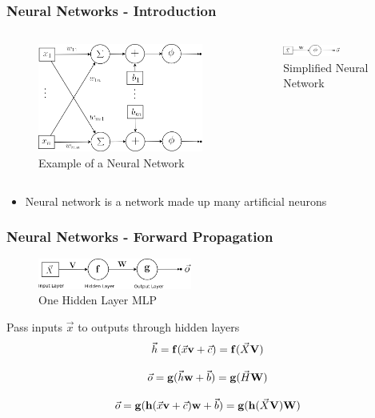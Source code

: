 \documentclass{beamer}
\begin{document}
\begin{frame}
\frametitle{Neural Networks - Introduction}
\begin{columns}
\begin{figure}[t!]
    \centering
    \includegraphics[width=\textwidth]{../paper/pictures/figures/detail_NN.png}
    \caption{Example of a Neural Network}
    \label{fig:detail_NN}
\end{figure}

\begin{figure}[t!]
    \centering
    \includegraphics[width=0.6\textwidth]{../paper/pictures/figures/NN.png}
    \caption{Simplified Neural Network}
    \label{fig:NN}
\end{figure}
\end{columns}

\begin{itemize}
\item Neural network is a network made up many artificial neurons
\end{itemize}
\end{frame}

\begin{frame}
\frametitle{Neural Networks - Forward Propagation}
\begin{figure}[t!]
    \centering
    \includegraphics[width=0.45\textwidth]{../paper/pictures/figures/MLP.png}
    \caption{One Hidden Layer MLP}
    \label{fig:MLP}
\end{figure}

Pass inputs $\vec{x}$ to outputs through hidden layers \cite{murphy2012machine}
$$\vec{h} = \bold{f}(\vec{x}\bold{v}+\vec{c}) = \bold{f}(\vec{X}\bold{V})$$

$$\vec{o} = \bold{g}(\vec{h}\bold{w}+\vec{b}) = \bold{g}(\vec{H}\bold{W})$$

$$\vec{o} = \bold{g}(\bold{h}(\vec{x}\bold{v}+\vec{c})\bold{w}+\vec{b}) = \bold{g}(\bold{h}(\vec{X}\bold{V})\bold{W})$$
\end{frame}
\end{document}
